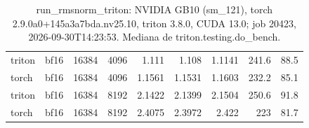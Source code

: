 \begin{table}[htbp]
\begin{tabular}{llrrrrrrr}
    triton & bf16 & 16384 & 4096 & 1.111 & 1.108 & 1.1141 & 241.6 & 88.5 \\
    torch & bf16 & 16384 & 4096 & 1.1561 & 1.1531 & 1.1603 & 232.2 & 85.1 \\
    triton & bf16 & 16384 & 8192 & 2.1422 & 2.1399 & 2.1504 & 250.6 & 91.8 \\
    torch & bf16 & 16384 & 8192 & 2.4075 & 2.3972 & 2.422 & 223 & 81.7 \\
    \bottomrule
  \end{tabular}
  \caption{run\_rmsnorm\_triton: NVIDIA GB10 (sm\_121), torch 2.9.0a0+145a3a7bda.nv25.10, triton 3.8.0, CUDA 13.0; job 20423, 2026-09-30T14:23:53. Mediana de triton.testing.do\_bench.}
  \label{tab:run-rmsnorm}
\end{table}
